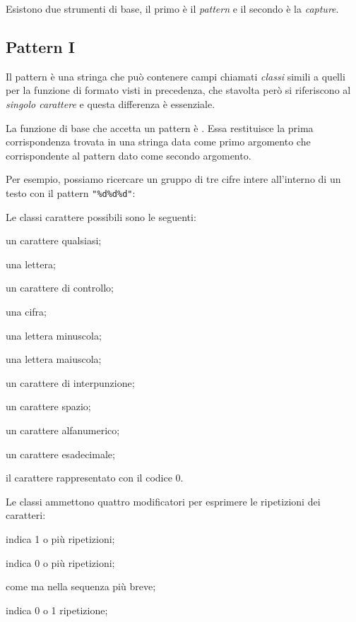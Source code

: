 Esistono due strumenti di base, il primo è il \emph{pattern} e il secondo è la
\emph{capture}.


\subsection{Pattern I}
\label{secFondPattern}

Il pattern è una stringa che può contenere campi chiamati \emph{classi} simili
a quelli per la funzione di formato visti in precedenza, che stavolta però si
riferiscono al \emph{singolo carattere} e questa differenza è essenziale.

La funzione di base che accetta un pattern è
. Essa restituisce la prima corrispondenza
trovata in una stringa data come primo argomento che corrispondente al pattern
dato come secondo argomento.

Per esempio, possiamo ricercare un gruppo di tre cifre intere all'interno di un
testo con il pattern \verb|"%d%d%d"|:

Le classi carattere possibili sono le seguenti:
\begin{compactdescription}
  \item[\key{.}] un carattere qualsiasi;
  \item[\key{\%a}] una lettera;
  \item[\key{\%c}] un carattere di controllo;
  \item[\key{\%d}] una cifra;
  \item[\key{\%l}] una lettera minuscola;
  \item[\key{\%u}] una lettera maiuscola;
  \item[\key{\%p}] un carattere di interpunzione;
  \item[\key{\%s}] un carattere spazio;
  \item[\key{\%w}] un carattere alfanumerico;
  \item[\key{\%x}] un carattere esadecimale;
  \item[\key{\%z}] il carattere rappresentato con il codice 0.
\end{compactdescription}

Le classi ammettono quattro modificatori per esprimere le ripetizioni dei
caratteri:
\begin{compactdescription}
  \item[\key{+}] indica 1 o più ripetizioni;
  \item[\key{*}] indica 0 o più ripetizioni;
  \item[\key{-}] come \key{*} ma nella sequenza più breve;
  \item[\key{?}] indica 0 o 1 ripetizione;
\end{compactdescription}

